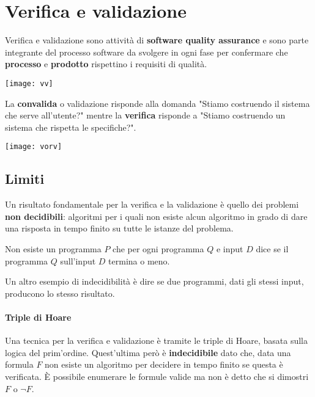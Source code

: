 \newpage
\section{Verifica e validazione}
Verifica e validazione sono attività di \textbf{software quality assurance} e sono parte integrante del processo software da svolgere in ogni fase per confermare che \textbf{processo} e \textbf{prodotto} rispettino i requisiti di qualità.
\begin{center}
	\texttt{[image: vv]}
\end{center}
La \textbf{convalida} o validazione risponde alla domanda "Stiamo costruendo il sistema che serve all'utente?" mentre la \textbf{verifica} risponde a "Stiamo costruendo un sistema che rispetta le specifiche?".
\begin{center}
	\texttt{[image: vorv]}
\end{center}

\subsection{Limiti}
Un risultato fondamentale per la verifica e la validazione è quello dei problemi \textbf{non decidibili}: algoritmi per i quali non esiste alcun algoritmo in grado di dare una risposta in tempo finito su tutte le istanze del problema.

\begin{definition}
	Non esiste un programma $P$ che per ogni programma $Q$ e input $D$ dice se il programma $Q$ sull'input $D$ termina o meno.
\end{definition}

Un altro esempio di indecidibilità è dire se due programmi, dati gli stessi input, producono lo stesso risultato.

\paragraph{Triple di Hoare}
Una tecnica per la verifica e validazione è tramite le triple di Hoare, basata sulla logica del prim'ordine. Quest'ultima però è \textbf{indecidibile} dato che, data una formula $F$ non esiste un algoritmo per decidere in tempo finito se questa è verificata. È possibile enumerare le formule valide ma non è detto che si dimostri $F$ o $\neg F$.

